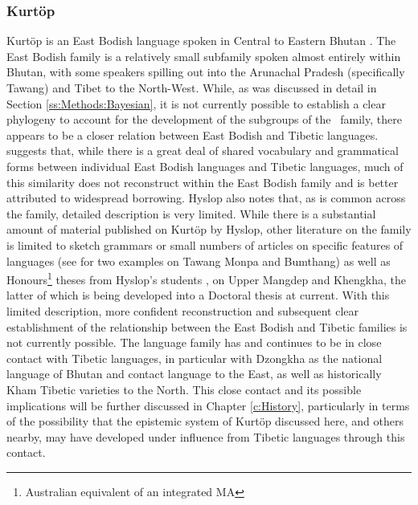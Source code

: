 \subsubsection{Kurtöp}
Kurtöp is an East Bodish language spoken in Central to Eastern Bhutan \cite{Hyslop2017}. The East Bodish family is a relatively small subfamily spoken almost entirely within Bhutan, with some speakers spilling out into the Arunachal Pradesh (specifically Tawang) and Tibet to the North-West. While, as was discussed in detail in Section \ref{ss:Methods:Bayesian}, it is not currently possible to establish a clear phylogeny to account for the development of the subgroups of the \lfam\ family, there appears to be a closer relation between East Bodish and Tibetic languages.  suggests that, while there is a great deal of shared vocabulary and grammatical forms between individual East Bodish languages and Tibetic languages, much of this similarity does not reconstruct within the East Bodish family and is better attributed to widespread borrowing. Hyslop also notes that, as is common across the family, detailed description is very limited. While there is a substantial amount of material published on Kurtöp by Hyslop, other literature on the family is limited to sketch grammars or small numbers of articles on specific features of languages (see  for two examples on Tawang Monpa and Bumthang) as well as Honours\footnote{Australian equivalent of an integrated MA} theses from Hyslop's students \cites{Bosch2016}{Hewitt2020}, on Upper Mangdep and Khengkha, the latter of which is being developed into a Doctoral thesis at current. With this limited description, more confident reconstruction and subsequent clear establishment of the relationship between the East Bodish and Tibetic families is not currently possible. The language family has and continues to be in close contact with Tibetic languages, in particular with Dzongkha as the national language of Bhutan and contact language to the East, as well as historically Kham Tibetic varieties to the North. This close contact and its possible implications will be further discussed in Chapter \ref{c:History}, particularly in terms of the possibility that the epistemic system of Kurtöp discussed here, and others nearby, may have developed under influence from Tibetic languages through this contact.

